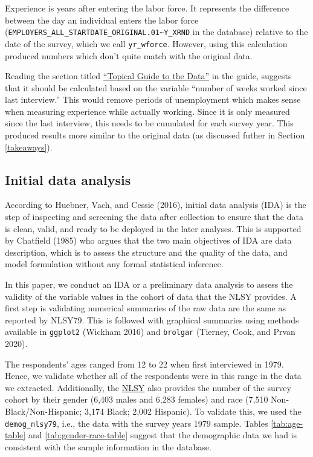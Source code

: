 \documentclass{article}
\begin{document}
Experience is years after entering the labor force. It represents the difference between the day an individual enters the labor force (\texttt{EMPLOYERS\_ALL\_STARTDATE\_ORIGINAL.01\textasciitilde{}Y\_XRND} in the database) relative to the date of the survey, which we call \texttt{yr\_wforce}. However, using this calculation produced numbers which don't quite match with the original data.

Reading the section titled \href{https://www.nlsinfo.org/content/cohorts/nlsy79/topical-guide/employment/work-experience}{``Topical Guide to the Data''} in the guide, suggests that it should be calculated based on the variable ``number of weeks worked since last interview.'' This would remove periods of unemployment which makes sense when measuring experience while actually working. Since it is only measured since the last interview, this needs to be cumulated for each survey year. This produced results more similar to the original data (as discussed futher in Section \ref{takeaways}).

\hypertarget{ida}{%
\subsection{Initial data analysis}\label{ida}}

According to Huebner, Vach, and Cessie (2016), initial data analysis (IDA) is the step of inspecting and screening the data after collection to ensure that the data is clean, valid, and ready to be deployed in the later analyses. This is supported by Chatfield (1985) who argues that the two main objectives of IDA are data description, which is to assess the structure and the quality of the data, and model formulation without any formal statistical inference.

In this paper, we conduct an IDA or a preliminary data analysis to assess the validity of the variable values in the cohort of data that the NLSY provides. A first step is validating numerical summaries of the raw data are the same as reported by NLSY79. This is followed with graphical summaries using methods available in \texttt{ggplot2} (Wickham 2016) and \texttt{brolgar} (Tierney, Cook, and Prvan 2020).

The respondents' ages ranged from 12 to 22 when first interviewed in 1979. Hence, we validate whether all of the respondents were in this range in the data we extracted. Additionally, the \href{https://www.nlsinfo.org/content/cohorts/nlsy79/intro-to-the-sample/nlsy79-sample-introduction}{NLSY} also provides the number of the survey cohort by their gender (6,403 males and 6,283 females) and race (7,510 Non-Black/Non-Hispanic; 3,174 Black; 2,002 Hispanic). To validate this, we used the \texttt{demog\_nlsy79}, i.e., the data with the survey years 1979 sample. Tables \ref{tab:age-table} and \ref{tab:gender-race-table} suggest that the demographic data we had is consistent with the sample information in the database.
\end{document}
